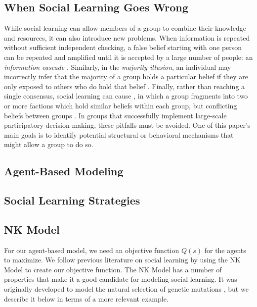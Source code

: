 \documentclass[manuscript,screen,review,acmsmall]{acmart}
\begin{document}
\subsection{When Social Learning Goes Wrong}
While social learning can allow members of a group to combine their knowledge and resources,
it can also introduce new problems.
When information is repeated without sufficient independent checking,
a false belief starting with one person can be repeated and amplified until it is accepted by a large number of people:
an {\em information cascade} \cite{banerjee_simple_1992}.
Similarly, in the {\em majority illusion},
an individual may incorrectly infer that the majority of a group holds a particular belief if they are only exposed to others who do hold that belief \cite{lerman_majority_2015}.
Finally,
rather than reaching a single consensus,
social learning can cause {\polarization},
in which a group fragments into two or more factions which hold similar beliefs within each group,
but conflicting beliefs between groups
\cite{schkade_what_2007}.
In groups that successfully implement large-scale participatory decision-making,
these pitfalls must be avoided.
One of this paper's main goals is to identify potential structural or behavioral mechanisms that might allow a group to do so.

\subsection{Agent-Based Modeling\label{subsec:abm}}

\subsection{Social Learning Strategies}

\subsection{NK Model\label{subsec:nk}}
For our agent-based model, we need an objective function $Q(s)$ for the agents to maximize.
We follow previous literature on social learning
\cite{lazer_network_2007,barkoczi_social_2016,gomez_clustering_2019}
by using the NK Model \cite{kauffman_towards_1987,weinberger_local_1991} to create our objective function.
The NK Model has a number of properties that make it a good candidate for modeling social learning.
It was originally developed to model the natural selection of genetic mutations \cite{kauffman_towards_1987},
but we describe it below in terms of a more relevant example.
\end{document}
